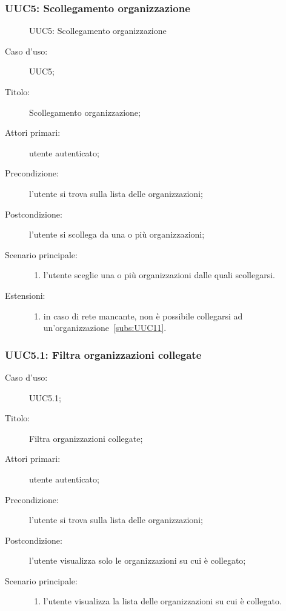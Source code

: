 \documentclass[../../../analisi-dei-requisiti.tex]{subfiles}
\begin{document}
\subsubsection{UUC5: Scollegamento organizzazione}%
\label{subs:UUC5}

\begin{figure}[H]
  \centering
  \caption{UUC5: Scollegamento organizzazione}%
  \label{fig:UUC11}
\end{figure}

\begin{description}
  \item[Caso d’uso:] UUC5;
  \item[Titolo:] Scollegamento organizzazione;
  \item[Attori primari:] utente autenticato;
  \item[Precondizione:] l'utente si trova sulla lista delle organizzazioni;
  \item[Postcondizione:] l'utente si scollega da una o più organizzazioni;
  \item[Scenario principale:]
        \begin{enumerate}
          \item l'utente sceglie una o più organizzazioni dalle quali scollegarsi.
        \end{enumerate}
  \item[Estensioni:]
        \begin{enumerate}
          \item in caso di rete mancante, non è possibile collegarsi ad un'organizzazione~\ref{subs:UUC11}.
        \end{enumerate}
\end{description}


\subsubsection{UUC5.1: Filtra organizzazioni collegate}%
\begin{description}
  \item[Caso d’uso:] UUC5.1;
  \item[Titolo:] Filtra organizzazioni collegate;
  \item[Attori primari:] utente autenticato;
  \item[Precondizione:] l'utente si trova sulla lista delle organizzazioni;
  \item[Postcondizione:] l'utente visualizza solo le organizzazioni su cui è collegato;
  \item[Scenario principale:]
        \begin{enumerate}
          \item l'utente visualizza la lista delle organizzazioni su cui è collegato.
        \end{enumerate}
\end{description}
\end{document}
